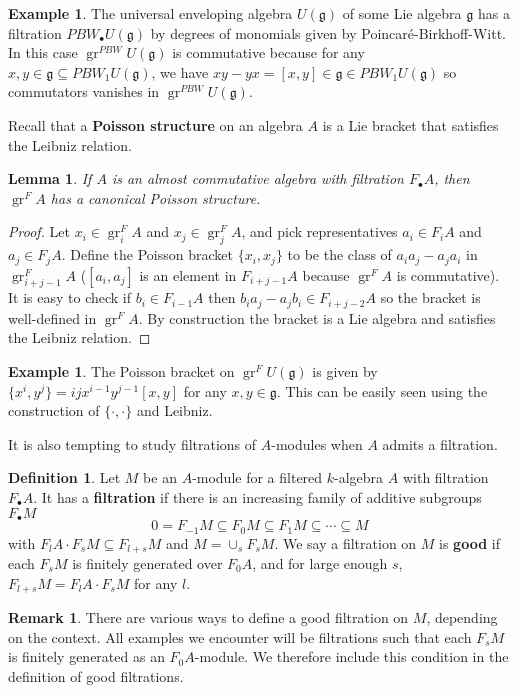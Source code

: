 \documentclass[11pt, a4paper]{article}
\newtheorem{lemma}[theorem]{Lemma}
\theoremstyle{definition}
\newtheorem{remark}[theorem]{Remark}
\newtheorem{example}[theorem]{Example}
\newtheorem{definition}[theorem]{Definition}
\newcommand{\gr}{\operatorname{gr}}
\newcommand{\g}{\mathfrak g}
\begin{document}
    \begin{example}
        The universal enveloping algebra $U(\g)$ of some Lie algebra $\g$ has a filtration $\mathit{PBW}_\bullet U(\g)$ by degrees of monomials given by Poincaré-Birkhoff-Witt. In this case $\gr^{\mathit{PBW}} U(\g)$ is commutative because for any $x, y\in\g\subseteq \mathit{PBW}_1 U(\g)$, we have $xy-yx=[x, y]\in\g\in \mathit{PBW}_1 U(\g)$ so commutators vanishes in $\gr^{\mathit{PBW}}U(\g)$.
    \end{example}
    Recall that a \textbf{Poisson structure} on an algebra $A$ is a Lie bracket that satisfies the Leibniz relation.
    \begin{lemma}
        If $A$ is an almost commutative algebra with filtration $F_\bullet A$, then $\gr^F A$ has a canonical Poisson structure.
    \end{lemma}
    \begin{proof}
        Let $x_i\in\gr^F_iA$ and $x_j\in\gr^F_jA$, and pick representatives $a_i\in F_iA$ and $a_j\in F_jA$. Define the Poisson bracket $\{x_i, x_j\}$ to be the class of $a_ia_j-a_ja_i$ in $\gr^F_{i+j-1}A$ ($[a_i, a_j]$ is an element in $F_{i+j-1}A$ because $\gr^F A$ is commutative). It is easy to check if $b_i\in F_{i-1}A$ then $b_ia_j-a_jb_i\in F_{i+j-2}A$ so the bracket is well-defined in $\gr^FA$. By construction the bracket is a Lie algebra and satisfies the Leibniz relation.
    \end{proof}
    \begin{example}
        The Poisson bracket on $\gr^F U(\g)$ is given by $\{x^i, y^j\}=ijx^{i-1}y^{j-1}[x, y]$ for any $x, y\in\g$. This can be easily seen using the construction of $\{\cdot, \cdot\}$ and Leibniz.
    \end{example}
    It is also tempting to study filtrations of $A$-modules when $A$ admits a filtration.
    \begin{definition}\label{def-filtered-module}
        Let $M$ be an $A$-module for a filtered $k$-algebra $A$ with filtration $F_\bullet A$. It has a \textbf{filtration} if there is an increasing family of additive subgroups $F_\bullet M$
        \[0=F_{-1}M\subseteq F_0M\subseteq F_1M\subseteq\cdots\subseteq M\]
        with $F_lA\cdot F_sM\subseteq F_{l+s}M$ and $M=\cup_s F_sM$. We say a filtration on $M$ is \textbf{good} if each $F_sM$ is finitely generated over $F_0A$, and for large enough $s$, $F_{l+s}M=F_lA\cdot F_sM$ for any $l$.
    \end{definition}
    \begin{remark}
        There are various ways to define a good filtration on $M$, depending on the context. All examples we encounter will be filtrations such that each $F_sM$ is finitely generated as an $F_0A$-module. We therefore include this condition in the definition of good filtrations.
    \end{remark}
\end{document}
